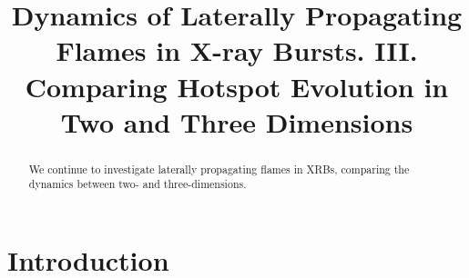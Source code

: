 \documentclass[preprint,times,tighten]{aastex631}
\begin{document}
\title{Dynamics of Laterally Propagating Flames in X-ray Bursts. III. Comparing Hotspot Evolution in Two and Three Dimensions}












\begin{abstract}
We continue to investigate laterally propagating flames in XRBs,
comparing the dynamics between two- and three-dimensions.
\end{abstract}


\section{Introduction}\label{Sec:Introduction}
\end{document}
